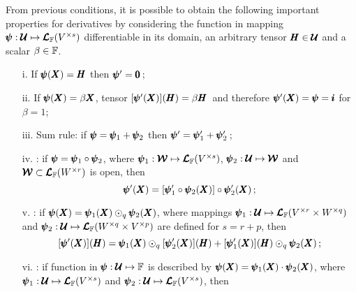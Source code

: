 From previous conditions, it is possible to obtain the following important properties for derivatives by considering the function in mapping $\pmb{\psi} : \pmb{\mathcal{U}} \mapsto \pmb{\mathcal{L}}_{\mathbb{F}}(V^{\times s})$ differentiable in its domain, an arbitrary tensor $\pmb{H}\in\pmb{\mathcal{U}}$ and a scalar $\beta\in\mathbb{F}$.
\begin{itemize}
	\setlength\itemsep{.1em}
	\item[i.] If $\pmb{\psi}(\pmb{X})=\pmb{H}$ then $\pmb{\psi}'=\pmb{0}\,$;
	\item[ii.] If $\pmb{\psi}(\pmb{X})=\beta\pmb{X}$, tensor $[\pmb{\psi}'(\pmb{X})](\pmb{H})=\beta\pmb{H}\,$ and therefore $\pmb{\psi}'(\pmb{X})=\pmb{\psi}=\pmb{i}$ for $\beta=1$;
	\item[iii.] Sum rule: if $\pmb{\psi}=\pmb{\psi}_1+\pmb{\psi}_2$ then $\pmb{\psi}'=\pmb{\psi}_1'+\pmb{\psi}_2'\,$;
	\item[iv.] : if $\pmb{\psi}=\pmb{\psi}_1\circ\pmb{\psi}_2$, where $\pmb{\psi}_1 : \pmb{\mathcal{W}} \mapsto \pmb{\mathcal{L}}_{\mathbb{F}}(V^{\times s})$, $\pmb{\psi}_2 : \pmb{\mathcal{U}} \mapsto \pmb{\mathcal{W}}$ and $\pmb{\mathcal{W}}\subset\pmb{\mathcal{L}}_{\mathbb{F}}(W^{\times r})$ is open, then
	\begin{equation}\label{eq:chainRule}
		\pmb{\psi}'(\pmb{X})=[\pmb{\psi}_1'\circ\pmb{\psi}_2(\pmb{X})]\circ\pmb{\psi}_2'(\pmb{X})\,;
	\end{equation}
    \item[v.] : if $\pmb{\psi}(\pmb{X})=\pmb{\psi}_1(\pmb{X})\odot_q\pmb{\psi}_2(\pmb{X})$, where mappings  $\pmb{\psi}_1 : \pmb{\mathcal{U}} \mapsto \pmb{\mathcal{L}}_{\mathbb{F}}(V^{\times r}\times W^{\times q})$ and $\pmb{\psi}_2 : \pmb{\mathcal{U}} \mapsto \pmb{\mathcal{L}}_{\mathbb{F}}(W^{\times q}\times V^{\times p})$ are defined for $s=r+p$, then
	\begin{equation}
		[\pmb{\psi}'(\pmb{X})](\pmb{H})=\pmb{\psi}_1(\pmb{X})\odot_{q}[\pmb{\psi}_2'(\pmb{X})](\pmb{H}) + [\pmb{\psi}_1'(\pmb{X})](\pmb{H}) \odot_{q} \pmb{\psi}_2(\pmb{X})\,;
	\end{equation}
	\item[vi.] : if function in $\pmb{\psi} : \pmb{\mathcal{U}} \mapsto \mathbb{F}$ is described by $\pmb{\psi}(\pmb{X})=\pmb{\psi}_1(\pmb{X})\cdot\pmb{\psi}_2(\pmb{X})$, where $\pmb{\psi}_1 : \pmb{\mathcal{U}} \mapsto \pmb{\mathcal{L}}_{\mathbb{F}}(V^{\times s})$ and $\pmb{\psi}_2 : \pmb{\mathcal{U}} \mapsto \pmb{\mathcal{L}}_{\mathbb{F}}(V^{\times s})$, then

\end{itemize}
